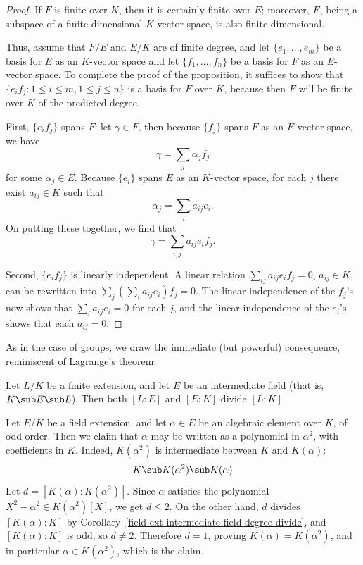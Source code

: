 \begin{proof}
If $F$ is finite over $K$, then it is certainly finite over $E$; moreover, $E$, being a subspace of a finite-dimensional $K$-vector space, is also finite-dimensional.\par
Thus, assume that $F/E$ and $E/K$ are of finite degree, and let $\{e_1,\dots,e_m\}$ be a basis for $E$ as an $K$-vector space and let $\{f_1,\dots,f_n\}$ be a basis for $F$ as an $E$-vector space. To complete the proof of the proposition, it suffices to show that $\{e_if_j:1\leq i\leq m,1\leq j\leq n\}$ is a basis for $F$ over $K$, because then $F$ will be finite over $K$ of the predicted degree.\par
First, $\{e_if_j\}$ spans $F$: let $\gamma\in F$, then because $\{f_j\}$ spans $F$ as an $E$-vector space, we have
\[\gamma=\sum_j\alpha_jf_j\]
for some $\alpha_j\in E$. Because $\{e_i\}$ spans $E$ as an $K$-vector space, for each $j$ there exist $a_{ij}\in K$ such that
\[\alpha_j=\sum_ia_{ij}e_i.\]
On putting these together, we find that
\[\gamma=\sum_{i,j}a_{ij}e_if_j.\]

Second, $\{e_if_j\}$ is linearly independent. A linear relation $\sum_{ij}a_{ij}e_if_j=0$, $a_{ij}\in K$, can be rewritten into $\sum_j(\sum_ia_{ij}e_i)f_j=0$. The linear independence of the $f_j$'s now shows that $\sum_ia_{ij}e_i=0$ for each $j$, and the linear independence of the $e_i$'s shows that each $a_{ij}=0$.
\end{proof}
As in the case of groups, we draw the immediate (but powerful) consequence, reminiscent of Lagrange's theorem:
\begin{corollary}\label{field ext intermediate field degree divide}
Let $L/K$ be a finite extension, and let $E$ be an intermediate field (that is, $K\sub E\sub L$). Then both $[L:E]$ and $[E:K]$ divide $[L:K]$.
\end{corollary}
\begin{example}
Let $E/K$ be a field extension, and let $\alpha\in E$ be an algebraic element over $K$, of odd order. Then we claim that $\alpha$ may be written as a polynomial in $\alpha^2$, with coefficients in $K$. Indeed, $K(\alpha^2)$ is intermediate between $K$ and $K(\alpha)$: 
\[K\sub K(\alpha^2)\sub K(\alpha)\]
Let $d=[K(\alpha):K(\alpha^2)]$. Since $\alpha$ satisfies the polynomial $X^2-\alpha^2\in K(\alpha^2)[X]$, we get $d\leq 2$. On the other hand, $d$ divides $[K(\alpha):K]$ by Corollary~\ref{field ext intermediate field degree divide}, and $[K(\alpha):K]$ is odd, so $d\neq 2$. Therefore $d=1$, proving $K(\alpha)=K(\alpha^2)$, and in particular $\alpha\in K(\alpha^2)$, which is the claim.
\end{example}
